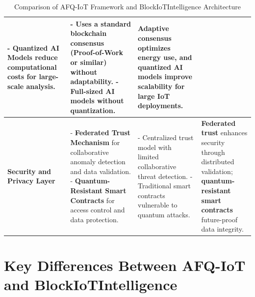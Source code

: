 \documentclass[12pt, oneside]{report}
\begin{document}
\begin{table}[h!]
{\begin{tabular}{|p{4cm}|p{5cm}|p{5cm}|p{5cm}|}
- \textbf{Quantized AI Models} reduce computational costs for large-scale analysis. & 
- Uses a standard blockchain consensus (Proof-of-Work or similar) without adaptability. \newline 
- Full-sized AI models without quantization. & 
\textbf{Adaptive consensus} optimizes energy use, and \textbf{quantized AI models} improve scalability for large IoT deployments. \\
\hline
\textbf{Security and Privacy Layer} & 
- \textbf{Federated Trust Mechanism} for collaborative anomaly detection and data validation. \newline 
- \textbf{Quantum-Resistant Smart Contracts} for access control and data protection. & 
- Centralized trust model with limited collaborative threat detection. \newline 
- Traditional smart contracts vulnerable to quantum attacks. & 
\textbf{Federated trust} enhances security through distributed validation; \textbf{quantum-resistant smart contracts} future-proof data integrity. \\
\hline
\end{tabular}%
}
\caption{Comparison of AFQ-IoT Framework and BlockIoTIntelligence Architecture}
\label{table:comparison}
\end{table}

\section{Key Differences Between AFQ-IoT and BlockIoTIntelligence}
\end{document}
